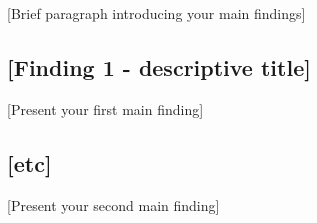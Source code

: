 
\label{sec:results}

[Brief paragraph introducing your main findings]

\subsection{[Finding 1 - descriptive title]}

[Present your first main finding]

\subsection{[etc]}

[Present your second main finding]
